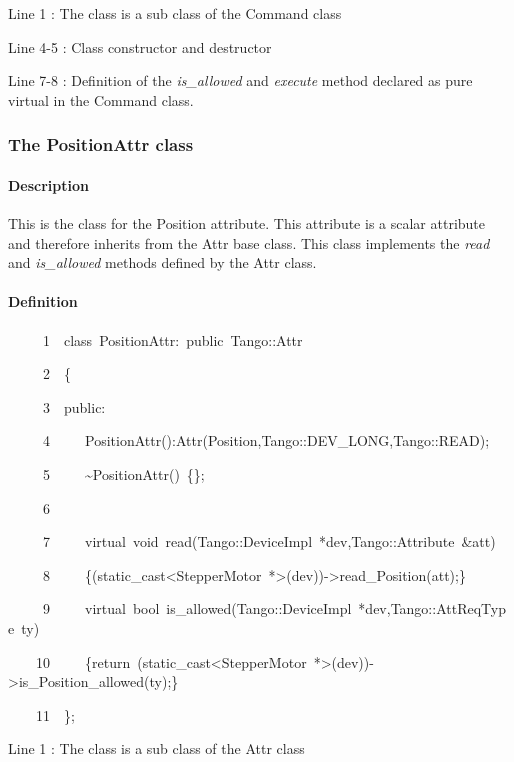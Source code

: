 Line 1 : The class is a sub class of the Command class

Line 4-5 : Class constructor and destructor

Line 7-8 : Definition of the \emph{is\_allowed} and \emph{execute}
method declared as pure virtual in the Command class.


\subsubsection{The PositionAttr class}


\paragraph{Description}

This is the class for the Position attribute. This attribute is a
scalar attribute and therefore inherits from the Attr base class.
This class implements the \emph{read} and \emph{is\_allowed}
methods defined by the Attr class.


\paragraph{Definition}


\begin{lyxcode}
~~~~~1~~class~PositionAttr:~public~Tango::Attr

~~~~~2~~\{

~~~~~3~~public:

~~~~~4~~~~~PositionAttr():Attr(\textquotedbl{}Position\textquotedbl{},Tango::DEV\_LONG,Tango::READ);

~~~~~5~~~~~\textasciitilde{}PositionAttr()~\{\};

~~~~~6~~~~~~~~~~

~~~~~7~~~~~virtual~void~read(Tango::DeviceImpl~{*}dev,Tango::Attribute~\&att)

~~~~~8~~~~~\{(static\_cast<StepperMotor~{*}>(dev))->read\_Position(att);\}

~~~~~9~~~~~virtual~bool~is\_allowed(Tango::DeviceImpl~{*}dev,Tango::AttReqType~ty)

~~~~10~~~~~\{return~(static\_cast<StepperMotor~{*}>(dev))->is\_Position\_allowed(ty);\}

~~~~11~~\};
\end{lyxcode}


Line 1 : The class is a sub class of the Attr class

